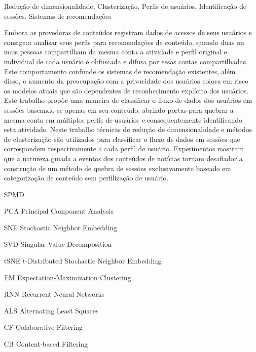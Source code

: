 \documentclass[ecp,tc,english]{iiufrgs}
\begin{document}
\begin{englishabstract}{}{Redução de dimensionalidade, Clusterização, Perfis de usuários, Identificação de sessões, Sistemas de recomendações}

  Embora as provedoras de conteúdos registram dados de acessos de seus usuários e consigam analisar seus perfis para recomendações de conteúdo, quando duas ou mais pessoas compartilham da mesma conta a atividade e perfil original e individual de cada usuário é obfuscada e difusa por essas contas compartilhadas. Este comportamento confunde os sistemas de recomendação existentes, além disso, o aumento da preocupação com a privacidade dos usuários coloca em risco os modelos atuais que são dependentes de reconhecimento explícito dos usuários.
  Este trabalho propõe uma maneira de classificar o fluxo de dados dos usuários em sessões baseando-se apenas em seu conteúdo, abrindo portas para quebrar a mesma conta em múltiplos perfis de usuários e consequentemente identificando esta atividade. Neste trabalho técnicas de redução de dimensionalidade e métodos de clusterização são utilizados para classificar o fluxo de dados em sessões que correspondem respectivamente a cada perfil de usuário.
  Experimentos mostram que a natureza guiada a eventos dos conteúdos de notícias tornam desafiador a construção de um método de quebra de sessões exclusivamente baseado em categorização de conteúdo sem perfilização de usuário.
\end{englishabstract}

\listoffigures 
\listoftables 

\begin{listofabbrv}{SPMD}
    \item[PCA] Principal Component Analysis
    \item[SNE] Stochastic Neighbor Embedding
    \item[SVD] Singular Value Decomposition
    \item[tSNE] t-Distributed Stochastic Neighbor Embedding
    \item[EM] Expectation-Maximization Clustering
    \item[RNN] Recurrent Neural Networks
    \item[ALS] Alternating Least Squares    
    \item[CF] Colaborative Filtering
    \item[CB] Content-based Filtering
\end{listofabbrv}
\end{document}
